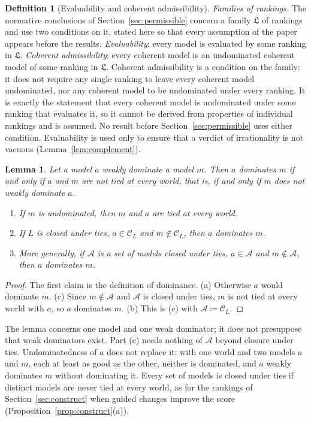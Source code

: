 \documentclass[11pt]{article}
\newtheorem{lemma}[theorem]{Lemma}
\theoremstyle{definition}
\newtheorem{definition}[theorem]{Definition}
\theoremstyle{remark}
\newcommand{\C}{\mathcal C}
\newcommand{\Lf}{\mathfrak L}
\begin{document}
\begin{definition}[Evaluability and coherent admissibility]\label{def:family-assumptions}
\emph{Families of rankings.} The normative conclusions of Section~\ref{sec:permissible} concern a family $\Lf$ of rankings and use two conditions on it, stated here so that every assumption of the paper appears before the results. \emph{Evaluability}: every model is evaluated by some ranking in $\Lf$. \emph{Coherent admissibility}: every coherent model is an undominated coherent model of some ranking in $\Lf$. Coherent admissibility is a condition on the family: it does not require any single ranking to leave every coherent model undominated, nor any coherent model to be undominated under every ranking. It is exactly the statement that every coherent model is undominated under some ranking that evaluates it, so it cannot be derived from properties of individual rankings and is assumed. No result before Section~\ref{sec:permissible} uses either condition. Evaluability is used only to ensure that a verdict of irrationality is not vacuous (Lemma~\ref{lem:complement}).
\end{definition}

\begin{lemma}\label{lem:ties}
Let a model $a$ weakly dominate a model $m$. Then $a$ dominates $m$ if and only if $a$ and $m$ are not tied at every world, that is, if and only if $m$ does not weakly dominate $a$.
\begin{enumerate}[label=(\alph*)]
\item If $m$ is undominated, then $m$ and $a$ are tied at every world.
\item If $L$ is closed under ties, $a\in\C_L$ and $m\notin\C_L$, then $a$ dominates $m$.
\item More generally, if $\mathcal A$ is a set of models closed under ties, $a\in\mathcal A$ and $m\notin\mathcal A$, then $a$ dominates $m$.
\end{enumerate}
\end{lemma}
\begin{proof}
The first claim is the definition of dominance. (a) Otherwise $a$ would dominate $m$. (c) Since $m\notin\mathcal A$ and $\mathcal A$ is closed under ties, $m$ is not tied at every world with $a$, so $a$ dominates $m$. (b) This is (c) with $\mathcal A\coloneqq\C_L$.
\end{proof}
The lemma concerns one model and one weak dominator; it does not presuppose that weak dominators exist. Part (c) needs nothing of $\mathcal A$ beyond closure under ties. Undominatedness of $a$ does not replace it: with one world and two models $a$ and $m$, each at least as good as the other, neither is dominated, and $a$ weakly dominates $m$ without dominating it. Every set of models is closed under ties if distinct models are never tied at every world, as for the rankings of Section~\ref{sec:construct} when guided changes improve the score (Proposition~\ref{prop:construct}(a)).
\end{document}
